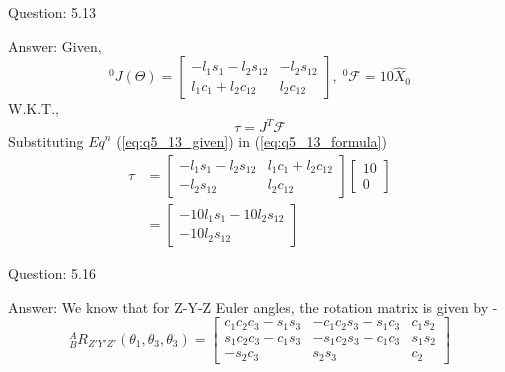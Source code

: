 \documentclass[a4paper]{article}
\begin{document}
\begin{qalist}
		\item[Question: 5.13] \setcounter{equation}{0} %
		\item[Answer:] Given, 
			\begin{equation} \label{eq:q5_13_given}
				{}^{0}J(\Theta) = \begin{bmatrix} -{l}_{1}{s}_{1}-{l}_{2}{s}_{12} & -{l}_{2}{s}_{12} \\ {l}_{1}{c}_{1} + {l}_{2}{c}_{12} & {l}_{2}{c}_{12} \end{bmatrix} ,\; {}^{0}\mathcal{F} = 10 {\hat{X}}_{0}
			\end{equation}
			W.K.T., 
			\begin{equation}\label{eq:q5_13_formula}\tau = {J}^{T} \mathcal{F}\end{equation}
			Substituting ${Eq}^{n}$ (\ref{eq:q5_13_given}) in (\ref{eq:q5_13_formula})
			\begin{align}
				\tau &=  \begin{bmatrix} -{l}_{1}{s}_{1}-{l}_{2}{s}_{12} &  {l}_{1}{c}_{1} + {l}_{2}{c}_{12} \\ -{l}_{2}{s}_{12} & {l}_{2}{c}_{12} \end{bmatrix} \begin{bmatrix} 10 \\ 0\end{bmatrix} \\
				&= \begin{bmatrix} -10{l}_{1}{s}_{1}-10{l}_{2}{s}_{12} \\ -10{l}_{2}{s}_{12}\end{bmatrix}
			\end{align}
		
		\newpage
		
		\item[Question: 5.16] \setcounter{equation}{0} %
		\item[Answer:] We know that for Z-Y-Z Euler angles, the rotation matrix is given by - 
			\begin{equation} \label{eq:q5_16_zyzRotMat}
				{}^{A}_{B}{R}_{Z'Y'Z'}({\theta}_{1}, {\theta}_{3}, {\theta}_{3}) = \begin{bmatrix}{c}_{1}{c}_{2}{c}_{3} - {s}_{1}{s}_{3} & -{c}_{1}{c}_{2}{s}_{3}-{s}_{1}{c}_{3} & {c}_{1}{s}_{2} \\ {s}_{1}{c}_{2}{c}_{3} - {c}_{1}{s}_{3} & -{s}_{1}{c}_{2}{s}_{3}-{c}_{1}{c}_{3} & {s}_{1}{s}_{2} \\ -{s}_{2}{c}_{3} & {s}_{2}{s}_{3} & {c}_{2}\end{bmatrix}
			\end{equation}
			

\end{qalist}
\end{document}
